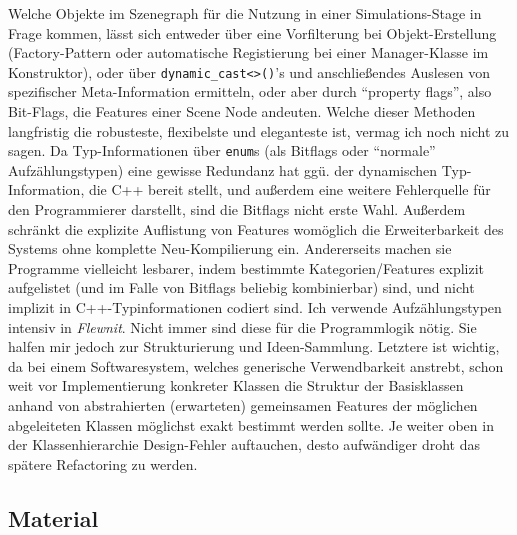 	Welche Objekte im Szenegraph für die Nutzung in einer Simulations-Stage in Frage kommen, lässt sich entweder
	über eine Vorfilterung bei Objekt-Erstellung (Factory-Pattern oder automatische Registierung bei einer 
	Manager-Klasse im Konstruktor), oder über \lstinline|dynamic_cast<>()|'s und anschließendes Auslesen von spezifischer
	Meta-Information ermitteln, oder aber durch "`property flags"', also Bit-Flags, die Features einer Scene Node andeuten.
	Welche dieser Methoden langfristig die robusteste, flexibelste und eleganteste ist,
	vermag ich noch nicht zu sagen. Da Typ-Informationen über \lstinline|enum|s 
	(als Bitflags oder "`normale"' Aufzählungstypen)
	eine gewisse Redundanz hat ggü. der dynamischen Typ-Information, die C++ bereit stellt, und außerdem eine weitere
	Fehlerquelle für den Programmierer darstellt, sind die Bitflags nicht erste Wahl. Außerdem schränkt die explizite 
	Auflistung von Features womöglich die Erweiterbarkeit des Systems ohne komplette Neu-Kompilierung ein.
	Andererseits machen sie Programme vielleicht lesbarer, indem bestimmte Kategorien/Features explizit aufgelistet 
	(und im Falle von Bitflags beliebig kombinierbar) sind, 
	und nicht implizit in C++-Typinformationen codiert sind.
	Ich verwende Aufzählungstypen intensiv in \emph{Flewnit}. Nicht immer sind diese für die Programmlogik nötig.
	Sie halfen mir jedoch zur Strukturierung und Ideen-Sammlung. Letztere ist wichtig, da bei einem Softwaresystem,
	welches generische Verwendbarkeit anstrebt, schon weit vor Implementierung konkreter Klassen die Struktur der
	Basisklassen anhand von abstrahierten (erwarteten) gemeinsamen Features der möglichen abgeleiteten Klassen
	möglichst exakt bestimmt werden sollte. Je weiter oben in der Klassenhierarchie Design-Fehler auftauchen, desto
	aufwändiger droht das spätere Refactoring zu werden.

  
 
\subsection{Material}  

